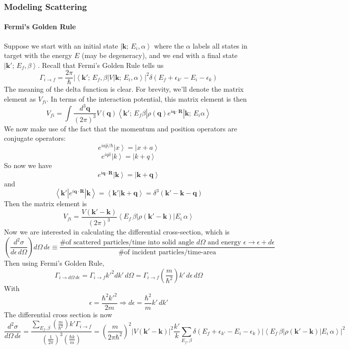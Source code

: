 \documentclass{article}
\begin{document}
			\subsubsection{Modeling Scattering}
			\paragraph{Fermi's Golden Rule} Suppose we start with an initial state $\left|\mathbf{k};\,E_i,\alpha\right>$ where the $\alpha$ labels all states in target with the energy $E$ (may be degeneracy), and we end with a final state $\left|\mathbf{k}';\,E_f,\beta\right>$. Recall that Fermi's Golden Rule tells us
			$$\Gamma_{i\to f}=\frac{2\pi}{\hbar}\left|\left<\mathbf{k}';\,E_f,\beta\right|V\left|\mathbf{k};\,E_i,\alpha\right>\right|^2\delta(E_f+\epsilon_{k'}-E_i-\epsilon_k)$$
			The meaning of the delta function is clear. For brevity, we'll denote the matrix element as $V_{fi}$. In terms of the interaction potential, this matrix element is then
			$$V_{fi}=\int\frac{d^3\mathbf{q}}{(2\pi)^3}V(\mathbf{q})\left<\mathbf{k}';\,E_f\beta\left|\rho(\mathbf{q})e^{i\mathbf{q}\cdot \mathbf{R}}\right|\mathbf{k};\,E_i\alpha\right>$$
			We now make use of the fact that the momentum and position operators are conjugate operators:
			$$e^{ia\hat{p}/\hbar}\left|x\right>=\left|x+a\right>$$
			$$e^{iq\hat{x}}\left|k\right>=\left|k+q\right>$$
			So now we have
			$$e^{i\mathbf{q}\cdot\mathbf{R}}\left|\mathbf{k}\right>=\left|\mathbf{k}+\mathbf{q}\right>$$
			and
			$$\left<\mathbf{k}'\left| e^{i\mathbf{q}\cdot\mathbf{R}}\right|\mathbf{k}\right>=\left<\mathbf{k}'\right|\left.\mathbf{k}+\mathbf{q}\right>=\delta^3(\mathbf{k}'-\mathbf{k}-\mathbf{q})$$
			Then the matrix element is 
			$$V_{fi}=\frac{V(\mathbf{k}'-\mathbf{k})}{(2\pi)^3}\left<E_f\, \beta\left|\rho(\mathbf{k}'-\mathbf{k})\right|E_i\,\alpha\right>$$
			Now we are interested in calculating the differential cross-section, which is
			$$\left(\frac{d^2\sigma}{d\epsilon\,d\Omega}\right)d\Omega\, d\epsilon\equiv \frac{\textrm{\# of scattered particles/time into solid angle }d\Omega\textrm{ and energy }\epsilon\to\epsilon+d\epsilon}{\textrm{\# of incident particles/time-area}}$$
			Then using Fermi's Golden Rule,
			$$\Gamma_{i\to d\Omega\,d\epsilon}=\Gamma_{i\to f}{k'}^2dk'\,d\Omega=\Gamma_{i\to f}\left(\frac{m}{\hbar^2}\right)k'\,d\epsilon\,d\Omega$$
			With 
			$$\epsilon=\frac{\hbar^2{k'}^2}{2m}\Rightarrow d\epsilon=\frac{\hbar^2}{m}k'\,dk'$$
			The differential cross section is now
			$$\frac{d^2\sigma}{d\Omega\,d\epsilon}=\frac{\sum_{E_f, \beta}\left(\frac{m}{\hbar^2}\right)k'\Gamma_{i\to f}}{\left(\frac{1}{2\pi}\right)^3\left(\frac{\hbar k}{m}\right)}=\left(\frac{m}{2\pi \hbar^2}\right)^2\left|V(\mathbf{k}'-\mathbf{k})\right|^2\frac{k'}{k}\sum_{E_f,\beta}\delta(E_f+\epsilon_{k'}-E_i-\epsilon_k)\left|\left<E_f\,\beta\left|\rho(\mathbf{k}'-\mathbf{k})\right|E_i\,\alpha\right>\right|^2$$
\end{document}
